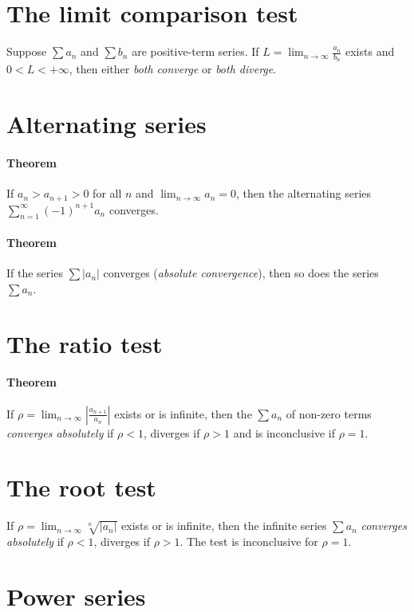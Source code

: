 \documentclass[a4paper,twocolumn,10pt]{article}
\begin{document}
  \section*{The limit comparison test}
  Suppose $\sum a_n$ and $\sum b_n$ are positive-term series. If $L =
  \lim_{n\to\infty}{\frac{a_n}{b_n}}$ exists and $0<L<+\infty$, then either
  \textit{both converge} or \textit{both diverge}.

  \section*{Alternating series}
  \paragraph{Theorem}
  If $a_n > a_{n+1} > 0$ for all $n$ and $\lim_{n\to\infty}{a_n} = 0$, then the
  alternating series $\sum_{n=1}^{\infty} (-1)^{n+1} a_n$ converges.

  \paragraph{Theorem}
  If the series $\sum|a_n|$ converges (\textit{absolute convergence}), then so
  does the series $\sum a_n$.

  \section*{The ratio test}
  \paragraph{Theorem} If $\rho = \lim_{n\to\infty}|\frac{a_{n+1}}{a_n}|$ exists
  or is infinite, then the $\sum a_n$ of non-zero terms \textit{converges
  absolutely} if $\rho < 1$, diverges if $\rho > 1$ and is inconclusive if
  $\rho = 1$.

  \section*{The root test}
  If $\rho = \lim_{n\to\infty}{\sqrt[n]{|a_n|}}$ exists or is infinite, then the
  infinite series $\sum a_n$ \textit{converges absolutely} if $\rho < 1$,
  diverges if $\rho > 1$. The test is inconclusive for $\rho = 1$.

  \section*{Power series}
\end{document}
